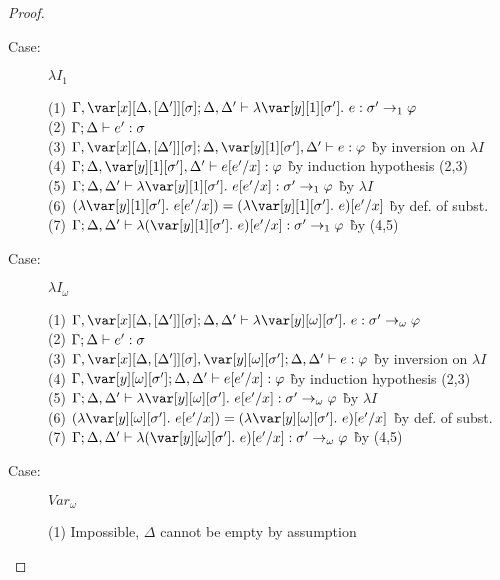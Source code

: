 \begin{proof}
\begin{description}
\item[Case:] $\lambda I_1$
\begin{tabbing}
    (1) $\G, \xD; \D, \D' \vdash \lambda \y[1][\s'].~e : \s' \to_1 \vp$\\
    (2) $\Gamma; \Delta \vdash e' : \sigma$\\
    (3) $\G, \xD; \D, \y[1][\s'], \D' \vdash e : \vp$ \` by inversion on $\lambda I$\\
    (4) $\G; \D, \y[1][\s'], \D' \vdash e[e'/x] : \vp$ \` by induction hypothesis (2,3)\\
    (5) $\G; \D, \D' \vdash \lambda \y[1][\s'].~e[e'/x] : \s' \to_1 \vp$ \` by $\lambda I$\\
    (6) $(\lambda \y[1][\s'].~e[e'/x]) = (\lambda \y[1][\s'].~e)[e'/x]$ \` by def. of subst.\\
    (7) $\G; \D, \D' \vdash \lambda (\y[1][\s'].~e)[e'/x] : \s' \to_1 \vp$ \` by (4,5)\\
\end{tabbing}

\item[Case:] $\lambda I_\omega$
\begin{tabbing}
    (1) $\G, \xD; \D, \D' \vdash \lambda \y[\omega][\s'].~e : \s' \to_\omega \vp$\\
    (2) $\Gamma; \Delta \vdash e' : \sigma$\\
    (3) $\G, \xD, \y[\omega][\s']; \D, \D' \vdash e : \vp$ \` by inversion on $\lambda I$\\
    (4) $\G, \y[\omega][\s']; \D, \D' \vdash e[e'/x] : \vp$ \` by induction hypothesis (2,3)\\
    (5) $\G; \D, \D' \vdash \lambda \y[\omega][\s'].~e[e'/x] : \s' \to_\omega \vp$ \` by $\lambda I$\\
    (6) $(\lambda \y[\omega][\s'].~e[e'/x]) = (\lambda \y[\omega][\s'].~e)[e'/x]$ \` by def. of subst.\\
    (7) $\G; \D, \D' \vdash \lambda (\y[\omega][\s'].~e)[e'/x] : \s' \to_\omega \vp$ \` by (4,5)\\
\end{tabbing}

\item[Case:] $Var_\omega$
\begin{tabbing}
    (1) Impossible, $\Delta$ cannot be empty by assumption\\
\end{tabbing}


\end{description}
\end{proof}
